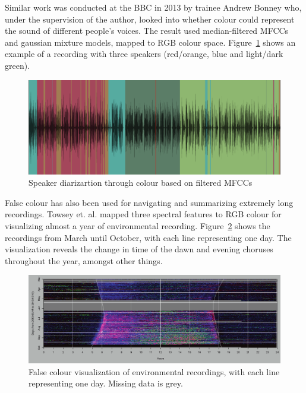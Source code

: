 Similar work was conducted at the BBC in 2013 by trainee Andrew Bonney who,
under the supervision of the author, looked into whether colour could represent
the sound of different people's voices. The result used median-filtered MFCCs
and gaussian mixture models, mapped to RGB colour space.
Figure~\ref{fig:bonney} shows an example of a recording with three speakers
(red/orange, blue and light/dark green).

\begin{figure}[ht]
  \centering
  \includegraphics[width=0.95\linewidth]{figs/bonney.png}
  \caption{Speaker diarizartion through colour based on filtered MFCCs}
  \label{fig:bonney}
\end{figure}

False colour has also been used for navigating and summarizing extremely long
recordings. Towsey et. al. \citep{Towsey2014} mapped three spectral features to
RGB colour for visualizing almost a year of environmental recording.
Figure~\ref{fig:towsey} shows the recordings from March until October, with
each line representing one day. The visualization reveals the change in time of
the dawn and evening choruses throughout the year, amongst other things.

\begin{figure}[ht]
  \centering
  \includegraphics[width=0.95\linewidth]{figs/towsey.png}
  \caption{False colour visualization of environmental recordings, with each
    line representing one day. Missing data is grey.
    \citep{Towsey2014}}
  \label{fig:towsey}
\end{figure}

